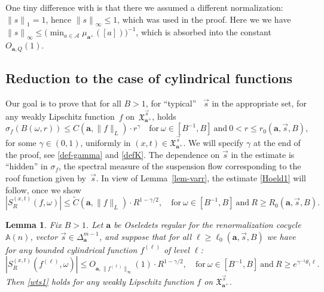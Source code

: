 \documentclass[10pt]{amsart}
\let\mathcal\mathscr
\theoremstyle{plain}
\newtheorem{lemma}[theorem]{Lemma}
\theoremstyle{definition}
\let\wt\widetilde
\newcommand\bom{{\boldsymbol a}}\let\ba\bom
\let\gam\gamma
\let\om\omega
\let\sig\sigma
\newcommand\Xx{\mathfrak{X}}
\newcommand\Ak{\mathcal{A}}
\newcommand\Aa{\mathbb{A}}
\newcommand\be{\begin{equation}}
\newcommand\ee{\end{equation}}
\begin{document}
One tiny difference with \cite[Prop.\,7.1]{BuSo18a} is that there we assumed a different normalization: ${\|s\|}_1=1$, hence ${\|s\|}_\infty\le 1$, which was used in the proof. Here we we have
${\|s\|}_\infty \le \bigl(\min_{a\in \Ak} \mu_{\bom^+}([a])\bigr)^{-1}$, which is absorbed into the constant $O_{\bom,Q}(1)$.

\subsection{Reduction to the case of cylindrical functions} \label{sec-reduc2}
Our goal is to prove that for all $B>1$, for ``typical'' \ $\vec{s}$ in the appropriate set, for any weakly Lipschitz function~$f$ on~$\Xx_{\bom^+}^{\vec{s}}$, holds
\be \label{Hoeld1}
\sig_f(B(\om,r)) \le C(\bom,\|f\|_L)\cdot r^\gam\quad \text{for}\ \om\in [B^{-1},B]\ \text{and}
\ 0 < r \le r_0(\bom,\vec{s}, B),
\ee
for some $\gam\in (0,1)$, uniformly in $(x,t)\in \Xx_{\bom^+}^{\vec{s}}$. We will specify $\gam$ at the end of the proof, see \eqref{def-gamma} and \eqref{defK}.
The dependence on $\vec{s}$ in the estimate is ``hidden'' in $\sig_f$, the spectral measure of the suspension flow corresponding to the roof function given by~$\vec{s}$.
In view of Lemma~\ref{lem-varr}, the estimate \eqref{Hoeld1} will follow, once we show
\be \label{wts1}
|S^{(x,t)}_R(f,\om)| \le \wt{C}(\bom,\|f\|_L)\cdot R^{1-\gam/2},\quad \text{for}\ \om\in [B^{-1},B]\ \text{and}\ R\ge R_0(\bom,\vec s, B).
\ee

\begin{lemma} \label{lem-reduc2}
Fix $B>1$. Let $\bom$ be Oseledets regular for the renormalization cocycle $\Aa(n)$, vector $\vec s\in \Delta_\bom^{m-1}$, and suppose that for all $\ell\ge \ell_0(\bom,\vec s,B)$ we have
for any bounded cylindrical function $f^{(\ell)}$ of level $\ell$:
\be \label{eq-wts111}
|S^{(x,t)}_R(f^{(\ell)},\om)| \le O_{\bom,\|f^{(\ell)}\|_\infty}(1)\cdot R^{1-\gam/2},\quad \text{for}\ \om\in [B^{-1},B]\ \text{and}\ R\ge e^{\gam^{-1}\theta_1 \ell}.
\ee
Then \eqref{wts1} holds for any weakly Lipschitz function $f$ on $\Xx_{\bom^+}^{\vec{s}}$.
\end{lemma}
\end{document}
